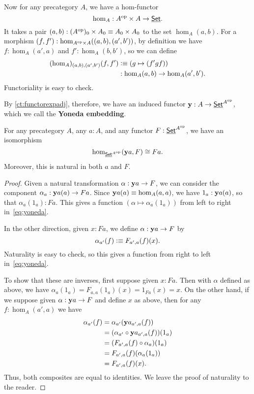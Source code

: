 Now for any precategory $A$, we have a hom-functor
\[\hom_A : A^{\textrm{op}} \times A \to \underline{\mathsf{Set}}.\]
It takes a pair $(a,b): (A^{\textrm{op}})_0 \times A_0 \equiv A_0 \times A_0$ to the set $\hom_A(a,b)$.
For a morphism $(f,f') : \hom_{A^{\textrm{op}}\times A}((a,b),(a',b'))$, by definition we have $f:\hom_A(a',a)$ and $f':\hom_A(b,b')$, so we can define 
\begin{align*}
  (\hom_A)_{(a,b),(a',b')}(f,f')
  &\vcentcolon\equiv (g \mapsto (f'gf))\\
  &: \hom_A(a,b) \to \hom_A(a',b').
\end{align*}
Functoriality is easy to check.

By \autoref{ct:functorexpadj}, therefore, we have an induced functor $\mathbf{y}:A\to \underline{\mathsf{Set}}^{A^{\textrm{op}}}$, which we call the \textbf{Yoneda embedding}.

\begin{thm}\label{ct:yoneda}
  For any precategory $A$, any $a:A$, and any functor $F:\underline{\mathsf{Set}}^{A^{\textrm{op}}}$, we have an isomorphism
  \begin{equation}\label{eq:yoneda}
    \hom_{\underline{\mathsf{Set}}^{A^{\textrm{op}}}}(\mathbf{y} a, F) \cong Fa.
  \end{equation}
  Moreover, this is natural in both $a$ and $F$.
\end{thm}
\begin{proof}
  Given a natural transformation $\alpha:\mathbf{y} a \to F$, we can consider the component $\alpha_a : \mathbf{y} a(a) \to F a$.
  Since $\mathbf{y} a(a)\equiv \hom_A(a,a)$, we have $1_a : \mathbf{y} a(a)$, so that $\alpha_a(1_a) : F a$.
  This gives a function $(\alpha \mapsto \alpha_a(1_a))$ from left to right in~\eqref{eq:yoneda}.

  In the other direction, given $x:F a$, we define $\alpha:\mathbf{y} a \to F$ by
  \[\alpha_{a'}(f) \vcentcolon\equiv F_{a',a}(f)(x). \]
  Naturality is easy to check, so this gives a function from right to left in~\eqref{eq:yoneda}.

  To show that these are inverses, first suppose given $x:F a$.
  Then with $\alpha$ defined as above, we have $\alpha_a(1_a) = F_{a,a}(1_a)(x) = 1_{F a}(x) = x$.
  On the other hand, if we suppose given $\alpha:\mathbf{y} a \to F$ and define $x$ as above, then for any $f:\hom_A(a',a)$ we have
  \begin{align*}
    \alpha_{a'}(f)
    &= \alpha_{a'} (\mathbf{y} a_{a',a}(f))\\
    &= (\alpha_{a'}\circ \mathbf{y} a_{a',a}(f))(1_a)\\
    &= (F_{a',a}(f)\circ \alpha_a)(1_a)\\
    &= F_{a',a}(f)(\alpha_a(1_a))\\
    &= F_{a',a}(f)(x).
  \end{align*}
  Thus, both composites are equal to identities.
  We leave the proof of naturality to the reader.
\end{proof}

